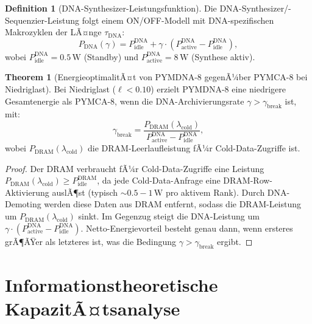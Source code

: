 ﻿\documentclass[a4paper,12pt]{article}
\theoremstyle{definition}
\newtheorem{definition}{Definition}[section]
\newtheorem{theorem}{Theorem}[section]
\begin{document}
\begin{definition}[DNA-Synthesizer-Leistungsfunktion]
  \label{def:dna_power}
  Die DNA-Synthesizer/-Sequenzier-Leistung folgt einem ON/OFF-Modell
  mit DNA-spezifischen Makrozyklen der LÃ¤nge $\tau_{\mathrm{DNA}}$:
  \begin{equation}
    P_{\mathrm{DNA}}(\gamma) = P_{\mathrm{idle}}^{\mathrm{DNA}}
    + \gamma \cdot (P_{\mathrm{active}}^{\mathrm{DNA}} - P_{\mathrm{idle}}^{\mathrm{DNA}}),
  \end{equation}
  wobei $P_{\mathrm{idle}}^{\mathrm{DNA}} = 0.5\,\mathrm{W}$ (Standby)
  und $P_{\mathrm{active}}^{\mathrm{DNA}} = 8\,\mathrm{W}$ (Synthese aktiv).
\end{definition}

\begin{theorem}[EnergieoptimalitÃ¤t von PYMDNA-8 gegenÃ¼ber PYMCA-8 bei Niedriglast]
  \label{thm:energie_optimal}
  Bei Niedriglast ($\ell < 0.10$) erzielt PYMDNA-8 eine niedrigere
  Gesamtenergie als PYMCA-8, wenn die DNA-Archivierungsrate
  $\gamma > \gamma_{\mathrm{break}}$ ist, mit:
  \begin{equation}
    \gamma_{\mathrm{break}} = \frac{P_{\mathrm{DRAM}}(\lambda_{\mathrm{cold}})}
    {P_{\mathrm{active}}^{\mathrm{DNA}} - P_{\mathrm{idle}}^{\mathrm{DNA}}},
  \end{equation}
  wobei $P_{\mathrm{DRAM}}(\lambda_{\mathrm{cold}})$ die DRAM-Leerlaufleistung
  fÃ¼r Cold-Data-Zugriffe ist.
\end{theorem}

\begin{proof}
  Der DRAM verbraucht fÃ¼r Cold-Data-Zugriffe eine Leistung
  $P_{\mathrm{DRAM}}(\lambda_{\mathrm{cold}}) \ge P_{\mathrm{idle}}^{\mathrm{DRAM}}$,
  da jede Cold-Data-Anfrage eine DRAM-Row-Aktivierung auslÃ¶st
  (typisch $\sim 0.5 - 1\,\mathrm{W}$ pro aktivem Rank).
  Durch DNA-Demoting werden diese Daten aus DRAM entfernt,
  sodass die DRAM-Leistung um $P_{\mathrm{DRAM}}(\lambda_{\mathrm{cold}})$
  sinkt. Im Gegenzug steigt die DNA-Leistung um
  $\gamma \cdot (P_{\mathrm{active}}^{\mathrm{DNA}} - P_{\mathrm{idle}}^{\mathrm{DNA}})$.
  Netto-Energievorteil besteht genau dann, wenn ersteres grÃ¶ÃŸer als
  letzteres ist, was die Bedingung $\gamma > \gamma_{\mathrm{break}}$ ergibt.
\end{proof}

\section{Informationstheoretische KapazitÃ¤tsanalyse}
\end{document}
